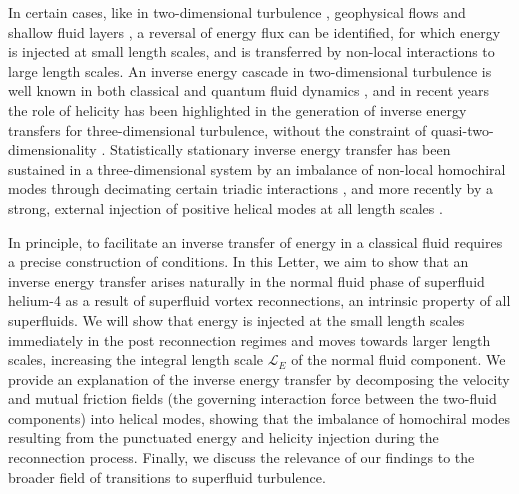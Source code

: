 \documentclass[%
 reprint,
 amsmath,amssymb,
 aps,
 prl,
]{revtex4-2}
\begin{document}
In certain cases, like in two-dimensional turbulence \cite{kraichnan1967}, geophysical flows \cite{smith1996} and shallow fluid layers \cite{celani2010}, a reversal of energy flux can be identified, for which energy is injected at small length scales, and is transferred by non-local interactions to large length scales. An inverse energy cascade in two-dimensional turbulence is well known in both classical and quantum fluid dynamics \cite{reeves2013}, and in recent years the role of helicity has been highlighted in the generation of inverse energy transfers for three-dimensional turbulence, without the constraint of quasi-two-dimensionality \cite{chen2003,biferaleInverseEnergyCascade2012a}. Statistically stationary inverse energy transfer has been sustained in a three-dimensional system by an imbalance of non-local homochiral modes through decimating certain triadic interactions \cite{biferaleInverseEnergyCascade2012a}, and more recently by a strong, external injection of positive helical modes at all length scales \cite{plunianInverseCascadeEnergy2020a}.

In principle, to facilitate an inverse transfer of energy in a classical fluid requires a precise construction of conditions. In this Letter, we aim to show that an inverse energy transfer arises naturally in the normal fluid phase of superfluid helium-4 as a result of superfluid vortex reconnections, an intrinsic property of all superfluids. We will show that energy is injected at the small length scales immediately in the post reconnection regimes and moves towards larger length scales, increasing the integral length scale $\mathcal{L}_E$ of the normal fluid component. We provide an explanation of the inverse energy transfer by decomposing the velocity and mutual friction fields (the governing interaction force between the two-fluid components) into helical modes, showing that the imbalance of homochiral modes resulting from the punctuated energy and helicity injection during the reconnection process. Finally, we discuss the relevance of our findings to the broader field of transitions to superfluid turbulence. 
\end{document}
